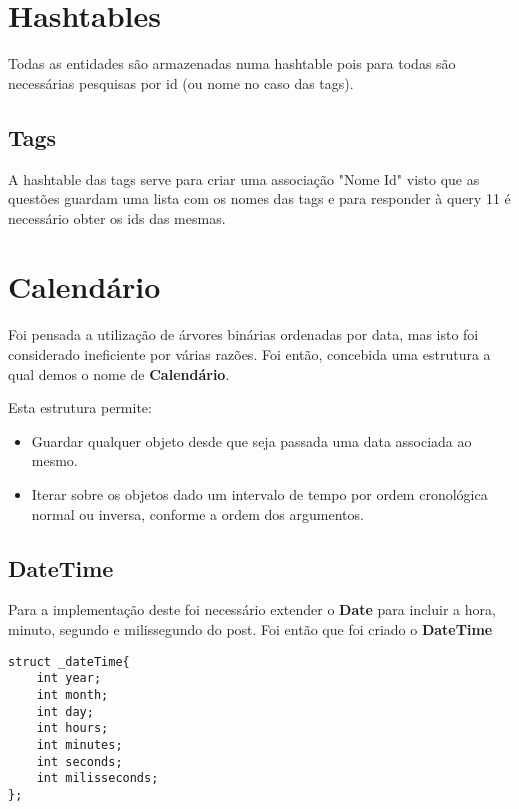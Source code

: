 \documentclass[10pt,a4paper]{report}
\begin{document}
    \section{Hashtables}
        Todas as entidades são armazenadas numa hashtable pois para todas são
        necessárias pesquisas por id (ou nome no caso das tags).
        \subsection{Tags}
        A hashtable das tags serve para criar uma associação "Nome Id" visto que
        as questões guardam uma lista com os nomes das tags e para responder à
        query 11 é necessário obter os ids das mesmas.

    \section{Calendário}
        Foi pensada a utilização de árvores binárias ordenadas por data,
        mas isto foi considerado ineficiente por várias razões. Foi então,
        concebida uma estrutura a qual demos o nome de \textbf{Calendário}.

        Esta estrutura permite:
        \begin{itemize}
                \item Guardar qualquer objeto desde que seja
                      passada uma data associada ao mesmo.
                \item Iterar sobre os objetos dado um intervalo de tempo
                      por ordem cronológica normal ou inversa, conforme a
                      ordem dos argumentos.
        \end{itemize}
        \subsection{DateTime}
        Para a implementação deste foi necessário extender o \textbf{Date} para
        incluir a hora, minuto, segundo e milissegundo do post. Foi então que
        foi criado o \textbf{DateTime}
    \begin{verbatim}
struct _dateTime{
    int year;
    int month;
    int day;
    int hours;
    int minutes;
    int seconds;
    int milisseconds;
};
    \end{verbatim}
        
\end{document}
